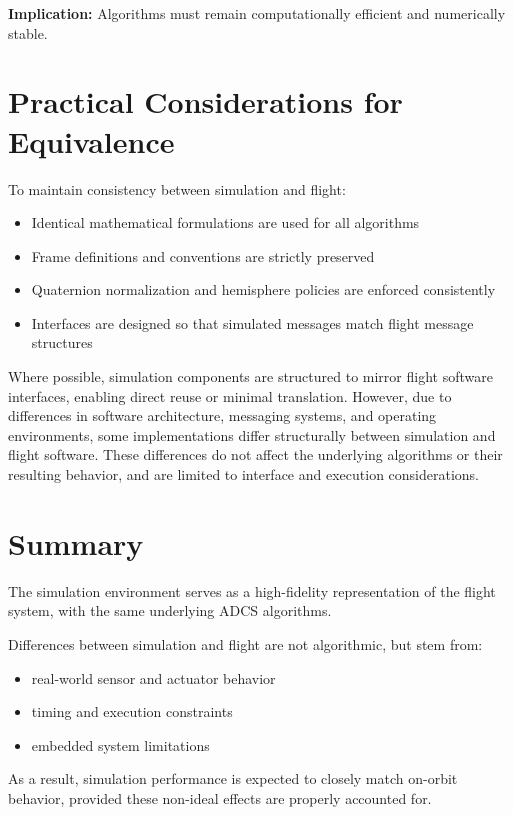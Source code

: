 \textbf{Implication:}  
Algorithms must remain computationally efficient and numerically stable.

\section{Practical Considerations for Equivalence}

To maintain consistency between simulation and flight:
\begin{itemize}
	\item Identical mathematical formulations are used for all algorithms
	\item Frame definitions and conventions are strictly preserved
	\item Quaternion normalization and hemisphere policies are enforced consistently
	\item Interfaces are designed so that simulated messages match flight message structures
\end{itemize}

Where possible, simulation components are structured to mirror flight software interfaces, enabling direct reuse or minimal translation. However, due to differences in software architecture, messaging systems, and operating environments, some implementations differ structurally between simulation and flight software. These differences do not affect the underlying algorithms or their resulting behavior, and are limited to interface and execution considerations.

\section{Summary}

The simulation environment serves as a high-fidelity representation of the flight system, with the same underlying ADCS algorithms.

Differences between simulation and flight are not algorithmic, but stem from:
\begin{itemize}
	\item real-world sensor and actuator behavior
	\item timing and execution constraints
	\item embedded system limitations
\end{itemize}

As a result, simulation performance is expected to closely match on-orbit behavior, provided these non-ideal effects are properly accounted for.